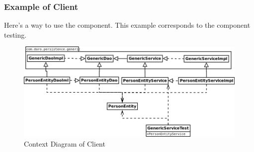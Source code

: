 \documentclass[a4paper,11pt]{book}
\begin{document}
\pagebreak
\subsubsection{Example of Client}
Here's a way to use the component. This example corresponds to the component testing.

\begin{figure}[h] %
  \includegraphics[width=\textwidth]{generic_persistence_class_diagram_to_use}
  \caption{Context Diagram of Client}
  \centering
  \label{fig:generic_persistence_class_diagram_to_use} %
\end{figure}
\end{document}
